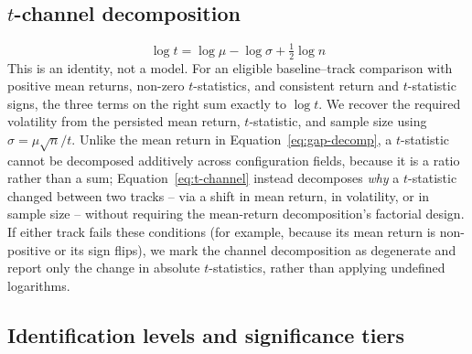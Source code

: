 \subsection{$t$-channel decomposition}
\begin{equation}
  \label{eq:t-channel}
  \log t = \log \mu - \log \sigma + \tfrac{1}{2} \log n
\end{equation}
This is an identity, not a model. For an eligible baseline--track comparison
with positive mean returns, non-zero $t$-statistics, and consistent return
and $t$-statistic signs, the three terms on the right sum exactly to
$\log t$. We recover the required volatility from the persisted mean return,
$t$-statistic, and sample size using $\sigma=\mu\sqrt{n}/t$. Unlike the mean
return in Equation~\eqref{eq:gap-decomp}, a $t$-statistic cannot be
decomposed additively across configuration fields, because it is a ratio
rather than a sum; Equation~\eqref{eq:t-channel} instead decomposes
\emph{why} a $t$-statistic changed between two tracks -- via a shift in mean
return, in volatility, or in sample size -- without requiring the mean-return
decomposition's factorial design. If either track fails these conditions
(for example, because its mean return is non-positive or its sign flips), we
mark the channel decomposition as degenerate and report only the change in
absolute $t$-statistics, rather than applying undefined logarithms.

\subsection{Identification levels and significance tiers}

